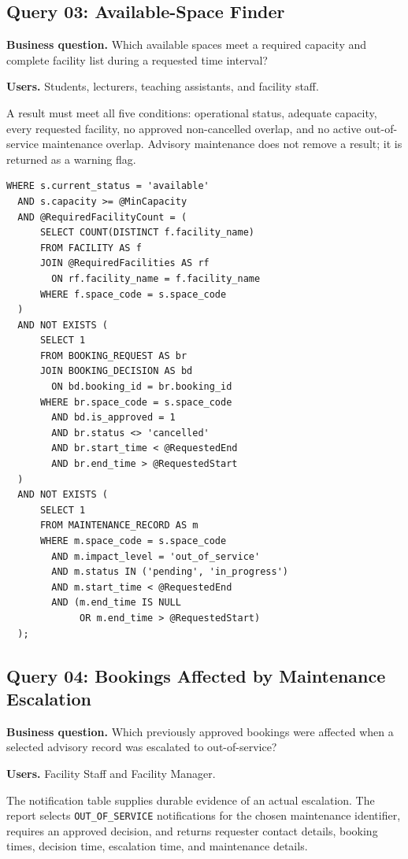 \subsection{Query 03: Available-Space Finder}

\textbf{Business question.} Which available spaces meet a required capacity and complete facility list during a requested time interval?

\textbf{Users.} Students, lecturers, teaching assistants, and facility staff.

A result must meet all five conditions: operational status, adequate capacity, every requested facility, no approved non-cancelled overlap, and no active out-of-service maintenance overlap. Advisory maintenance does not remove a result; it is returned as a warning flag.

\begin{lstlisting}[caption={Key predicates in Query 03.}]
WHERE s.current_status = 'available'
  AND s.capacity >= @MinCapacity
  AND @RequiredFacilityCount = (
      SELECT COUNT(DISTINCT f.facility_name)
      FROM FACILITY AS f
      JOIN @RequiredFacilities AS rf
        ON rf.facility_name = f.facility_name
      WHERE f.space_code = s.space_code
  )
  AND NOT EXISTS (
      SELECT 1
      FROM BOOKING_REQUEST AS br
      JOIN BOOKING_DECISION AS bd
        ON bd.booking_id = br.booking_id
      WHERE br.space_code = s.space_code
        AND bd.is_approved = 1
        AND br.status <> 'cancelled'
        AND br.start_time < @RequestedEnd
        AND br.end_time > @RequestedStart
  )
  AND NOT EXISTS (
      SELECT 1
      FROM MAINTENANCE_RECORD AS m
      WHERE m.space_code = s.space_code
        AND m.impact_level = 'out_of_service'
        AND m.status IN ('pending', 'in_progress')
        AND m.start_time < @RequestedEnd
        AND (m.end_time IS NULL
             OR m.end_time > @RequestedStart)
  );
\end{lstlisting}

\subsection{Query 04: Bookings Affected by Maintenance Escalation}

\textbf{Business question.} Which previously approved bookings were affected when a selected advisory record was escalated to out-of-service?

\textbf{Users.} Facility Staff and Facility Manager.

The notification table supplies durable evidence of an actual escalation. The report selects \texttt{OUT\_OF\_SERVICE} notifications for the chosen maintenance identifier, requires an approved decision, and returns requester contact details, booking times, decision time, escalation time, and maintenance details.

